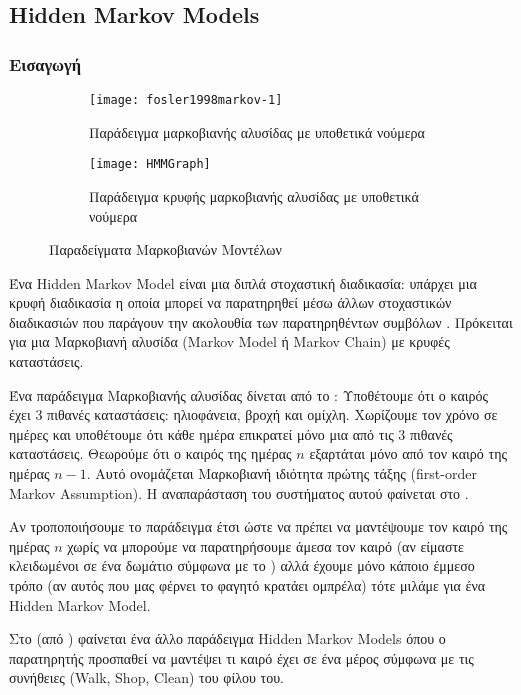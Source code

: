 \newcommand*{\hmm}{Hidden Markov Models}%
\subsection{\hmm{}}
\subsubsection{Εισαγωγή}
\begin{figure}[htb]
	\centering
	\begin{subfigure}{0.48\linewidth}
		\centering
		\texttt{[image: fosler1998markov-1]}
		\caption{Παράδειγμα μαρκοβιανής αλυσίδας με υποθετικά νούμερα \protect\cite{fosler1998markov}}
		\label{fig:fosler1998markov-1}
	\end{subfigure}\hfill
	\begin{subfigure}{0.48\linewidth}
		\centering
		\texttt{[image: HMMGraph]}
		\caption{Παράδειγμα κρυφής μαρκοβιανής αλυσίδας με υποθετικά νούμερα \protect\cite{wikiHMM}}
		\label{fig:HMMGraph}
	\end{subfigure}
	\caption{Παραδείγματα Μαρκοβιανών Μοντέλων}
\end{figure}
Ένα Hidden Markov Model είναι μια διπλά στοχαστική διαδικασία:
υπάρχει μια κρυφή διαδικασία η οποία μπορεί να παρατηρηθεί μέσω άλλων στοχαστικών διαδικασιών που παράγουν την ακολουθία των παρατηρηθέντων συμβόλων \cite{rabiner1986introduction}.
Πρόκειται για μια Μαρκοβιανή αλυσίδα (Markov Model ή Markov Chain) με κρυφές καταστάσεις.

Ένα παράδειγμα Μαρκοβιανής αλυσίδας δίνεται από το \cite{fosler1998markov}:
Υποθέτουμε ότι ο καιρός έχει 3 πιθανές καταστάσεις: ηλιοφάνεια, βροχή και ομίχλη.
Χωρίζουμε τον χρόνο σε ημέρες και υποθέτουμε ότι κάθε ημέρα επικρατεί μόνο μια από τις 3 πιθανές καταστάσεις.
Θεωρούμε ότι ο καιρός της ημέρας $n$ εξαρτάται μόνο από τον καιρό της ημέρας $n-1$.
Αυτό ονομάζεται Μαρκοβιανή ιδιότητα πρώτης τάξης (first-order Markov Assumption).
Η αναπαράσταση του συστήματος αυτού φαίνεται στο .

Αν τροποποιήσουμε το παράδειγμα έτσι ώστε να πρέπει να μαντέψουμε τον καιρό της ημέρας $n$ χωρίς να μπορούμε να παρατηρήσουμε άμεσα τον καιρό (αν είμαστε κλειδωμένοι σε ένα δωμάτιο σύμφωνα με το \cite{fosler1998markov})
αλλά έχουμε μόνο κάποιο έμμεσο τρόπο (αν αυτός που μας φέρνει το φαγητό κρατάει ομπρέλα) τότε μιλάμε για ένα Hidden Markov Model.

Στο  (από \cite{wikiHMM}) φαίνεται ένα άλλο παράδειγμα \hmm{} όπου ο παρατηρητής προσπαθεί να μαντέψει τι καιρό έχει σε ένα μέρος σύμφωνα με τις συνήθειες (Walk, Shop, Clean) του φίλου του.

